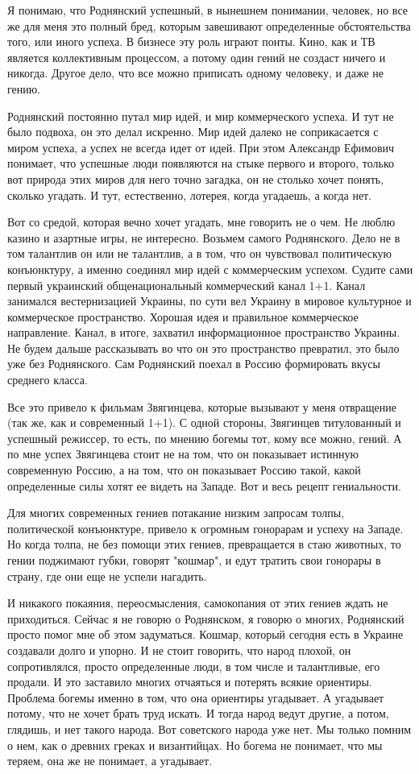 Я понимаю, что Роднянский успешный, в нынешнем понимании, человек, но все же
для меня это полный бред, которым завешивают определенные обстоятельства того,
или иного успеха. В бизнесе эту роль играют понты. Кино, как и ТВ является
коллективным процессом, а потому один гений не создаст ничего и никогда. Другое
дело, что все можно приписать одному человеку, и даже не гению. 

Роднянский постоянно путал мир идей, и мир коммерческого успеха. И тут не было
подвоха, он это делал искренно. Мир идей далеко не соприкасается с миром
успеха, а успех не всегда идет от идей. При этом Александр Ефимович понимает,
что успешные люди появляются на стыке первого и второго, только вот природа
этих миров для него точно загадка, он не столько хочет понять, сколько угадать.
И тут, естественно, лотерея, когда угадаешь, а когда нет. 

Вот со средой, которая вечно хочет угадать, мне говорить не о чем. Не люблю
казино и азартные игры, не интересно. Возьмем самого Роднянского. Дело не в том
талантлив он или не талантлив, а в том, что он чувствовал политическую
конъюнктуру, а именно соединял мир идей с коммерческим успехом. Судите сами
первый украинский общенациональный коммерческий канал 1+1. Канал занимался
вестернизацией Украины, по сути вел Украину в мировое культурное и коммерческое
пространство.  Хорошая идея и правильное коммерческое направление. Канал, в
итоге, захватил информационное пространство Украины. Не будем дальше
рассказывать во что он это пространство превратил, это было уже без
Роднянского. Сам Роднянский поехал в Россию формировать вкусы среднего класса. 

Все это привело к фильмам Звягинцева, которые вызывают у меня отвращение (так
же, как и современный 1+1). С одной стороны, Звягинцев титулованный и успешный
режиссер, то есть, по мнению богемы тот, кому все можно, гений. А по мне успех
Звягинцева стоит не на том, что он показывает истинную современную Россию, а на
том, что он показывает Россию такой, какой определенные силы хотят ее видеть на
Западе. Вот и весь рецепт гениальности. 

Для многих современных гениев потакание низким запросам толпы, политической
конъюнктуре, привело к огромным гонорарам и успеху на Западе. Но когда толпа,
не без помощи этих гениев, превращается в стаю животных, то гении поджимают
губки, говорят "кошмар", и едут тратить свои гонорары в страну, где они еще не
успели нагадить. 

И никакого покаяния, переосмысления, самокопания от этих гениев ждать не
приходиться. Сейчас я не говорю о Роднянском, я говорю о многих, Роднянский
просто помог мне об этом задуматься. Кошмар, который сегодня есть в Украине
создавали долго и упорно. И не стоит говорить, что народ плохой, он
сопротивлялся, просто определенные люди, в том числе и талантливые, его
продали. И это заставило многих отчаяться и потерять всякие ориентиры. Проблема
богемы именно в том, что она ориентиры угадывает. А угадывает потому, что не
хочет брать труд искать. И тогда народ ведут другие, а потом, глядишь, и нет
такого народа. Вот советского народа уже нет. Мы только помним о нем, как о
древних греках и византийцах. Но богема не понимает, что мы теряем, она же не
понимает, а угадывает.

